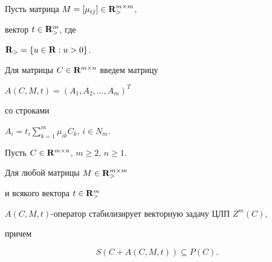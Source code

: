 Пусть матрица $M=[\mu_{ij}]\in {\bold R}_>^{m\times m}$,


вектор $t\in {\bold R}_>^m$, где


${\bold R}_>=\{u\in {\bold R}: u>0\}$.


Для матрицы $C\in {\bold R}^{m\times n}$ введем матрицу


$A(C, M, t)=(A_1, A_2,\dotsc, A_m)^T$


со строками


$A_i=t_i\sum\limits_{k=1}^m\mu_{ik}C_k$, $i\in N_m$.





\begin{thm}


Пусть $C\in {\bold R}^{m\times n}$, $m\ge 2$, $n\ge 1$.


Для любой матрицы $M\in {\bold R}_{>}^{m\times m}$


и всякого вектора $t\in {\bold R}_{>}^m$\;


$A(C, M, t)$-оператор стабилизирует векторную задачу ЦЛП $Z^m(C)$,


причем


$$


S(C+A(C, M, t))\subseteq P(C).


$$


\end{thm}





